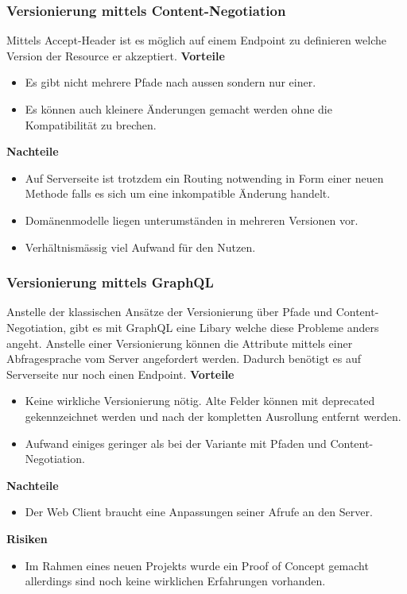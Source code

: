 \subsubsection{Versionierung mittels Content-Negotiation}

Mittels Accept-Header ist es möglich auf einem Endpoint zu definieren welche Version der Resource er akzeptiert.
\newline
\newline
\textbf{Vorteile}
\begin{itemize}
	\item Es gibt nicht mehrere Pfade nach aussen sondern nur einer.
	\item Es können auch kleinere Änderungen gemacht werden ohne die Kompatibilität zu brechen.
\end{itemize}
\textbf{Nachteile}
\begin{itemize}
	\item Auf Serverseite ist trotzdem ein Routing notwending in Form einer neuen Methode falls es sich um eine inkompatible Änderung handelt.
	\item Domänenmodelle liegen unterumständen in mehreren Versionen vor.
	\item Verhältnismässig viel Aufwand für den Nutzen.
\end{itemize}

\subsubsection{Versionierung mittels GraphQL}

Anstelle der klassischen Ansätze der Versionierung über Pfade und Content-Negotiation, gibt es mit GraphQL eine Libary welche diese Probleme anders angeht. Anstelle einer Versionierung können die Attribute mittels einer Abfragesprache vom Server angefordert werden. Dadurch benötigt es auf Serverseite nur noch einen Endpoint.
\newline
\newline
\textbf{Vorteile}
\begin{itemize}
	\item Keine wirkliche Versionierung nötig. Alte Felder können mit deprecated gekennzeichnet werden und nach der kompletten Ausrollung entfernt werden.
	\item Aufwand einiges geringer als bei der Variante mit Pfaden und Content-Negotiation.
\end{itemize}
\textbf{Nachteile}
\begin{itemize}
	\item Der Web Client braucht eine Anpassungen seiner Afrufe an den Server.
\end{itemize}
\textbf{Risiken}
\begin{itemize}
	\item Im Rahmen eines neuen Projekts wurde ein Proof of Concept gemacht allerdings sind noch keine wirklichen Erfahrungen vorhanden.
\end{itemize}

